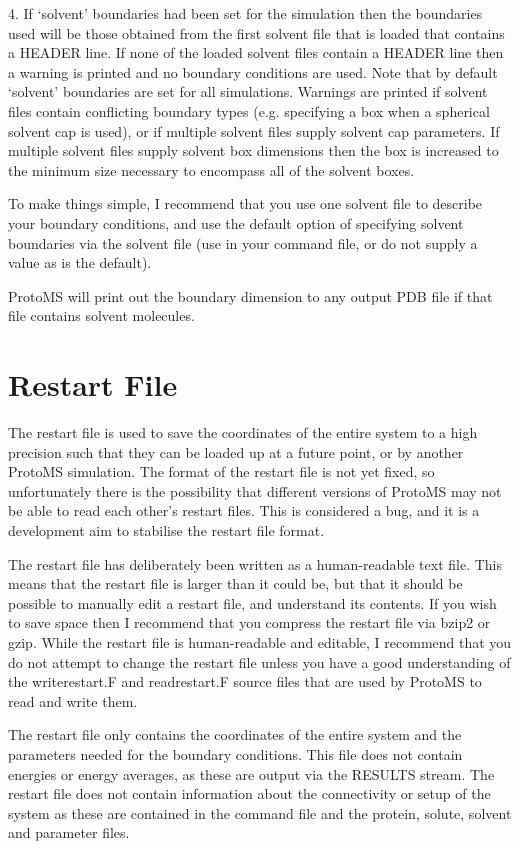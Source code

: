 \documentclass[letterpaper,10pt,english]{manual}
\begin{document}
4. If ‘solvent’ boundaries had been set for the simulation then the boundaries used will be those obtained from the first solvent file that is loaded that contains a HEADER line. If none of the loaded solvent files contain a HEADER line then a warning is printed and no boundary conditions are used. Note that by default ‘solvent’ boundaries are set for all simulations.
Warnings are printed if solvent files contain conflicting boundary types (e.g. specifying a box when a spherical solvent cap is used), or if multiple solvent files supply solvent cap parameters. If multiple solvent files supply solvent box dimensions then the box is increased to the minimum size necessary to encompass all of the solvent boxes.

To make things simple, I recommend that you use one solvent file to describe your boundary conditions, and use the default option of specifying solvent boundaries via the solvent file (use  in your command file, or do not supply a  value as  is the default).

ProtoMS will print out the boundary dimension to any output PDB file if that file contains solvent molecules.


\section{Restart File}

The restart file is used to save the coordinates of the entire system to a high precision such that they can be loaded up at a future point, or by another ProtoMS simulation. The format of the restart file is not yet fixed, so unfortunately there is the possibility that different versions of ProtoMS may not be able to read each other’s restart files. This is considered a bug, and it is a development aim to stabilise the restart file format.

The restart file has deliberately been written as a human-readable text file. This means that the restart file is larger than it could be, but that it should be possible to manually edit a restart file, and understand its contents. If you wish to save space then I recommend that you compress the restart file via bzip2 or gzip. While the
restart file is human-readable and editable, I recommend that you do not attempt to change the restart file unless you have a good understanding of the writerestart.F and readrestart.F source files that are used by ProtoMS to read and write them.

The restart file only contains the coordinates of the entire system and the parameters needed for the boundary conditions. This file does not contain energies or energy averages, as these are output via the RESULTS stream. The restart file does not contain information about the connectivity or setup of the system as these are contained in the command file and the protein, solute, solvent and parameter files.
\end{document}
